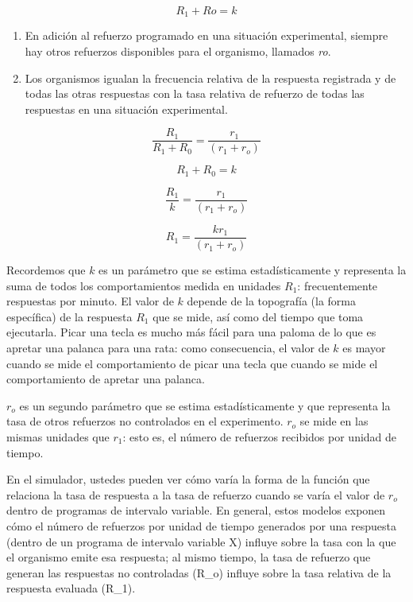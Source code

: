 \documentclass[
  a4paper,
  DIV=11,
  numbers=noendperiod]{scrreprt}
\begin{document}
\[R_1 +Ro = k\]

\begin{enumerate}
\def\labelenumi{\arabic{enumi}.}
\setcounter{enumi}{1}
\item
  En adición al refuerzo programado en una situación experimental,
  siempre hay otros refuerzos disponibles para el organismo, llamados
  \emph{ro}.
\item
  Los organismos igualan la frecuencia relativa de la respuesta
  registrada y de todas las otras respuestas con la tasa relativa de
  refuerzo de todas las respuestas en una situación experimental.
\end{enumerate}

\[\frac{R_1}{R_1 + R_0}= \frac {r_1} {(r_1 + r_o)}\]

\[R_1+R_0 = k\]

\[\frac{R_1}{k}= \frac {r_1} {(r_1 + r_o)}\]

\[R_1= \frac{kr_1} {(r_1 + r_o)}\]

Recordemos que \(k\) es un parámetro que se estima estadísticamente y
representa la suma de todos los comportamientos medida en unidades
\(R_1\): frecuentemente respuestas por minuto. El valor de \(k\) depende
de la topografía (la forma específica) de la respuesta \(R_1\) que se
mide, así como del tiempo que toma ejecutarla. Picar una tecla es mucho
más fácil para una paloma de lo que es apretar una palanca para una
rata: como consecuencia, el valor de \(k\) es mayor cuando se mide el
comportamiento de picar una tecla que cuando se mide el comportamiento
de apretar una palanca.

\(r_o\) es un segundo parámetro que se estima estadísticamente y que
representa la tasa de otros refuerzos no controlados en el experimento.
\(r_o\) se mide en las mismas unidades que \(r_1\): esto es, el número
de refuerzos recibidos por unidad de tiempo.

En el simulador, ustedes pueden ver cómo varía la forma de la función
que relaciona la tasa de respuesta a la tasa de refuerzo cuando se varía
el valor de \(r_o\) dentro de programas de intervalo variable. En
general, estos modelos exponen cómo el número de refuerzos por unidad de
tiempo generados por una respuesta (dentro de un programa de intervalo
variable X) influye sobre la tasa con la que el organismo emite esa
respuesta; al mismo tiempo, la tasa de refuerzo que generan las
respuestas no controladas (R\_o) influye sobre la tasa relativa de la
respuesta evaluada (R\_1).
\end{document}
